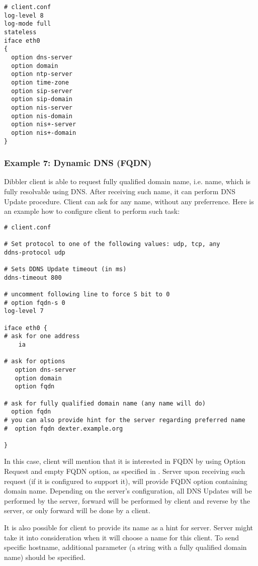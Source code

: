 \begin{lstlisting}
# client.conf
log-level 8
log-mode full
stateless
iface eth0
{
  option dns-server
  option domain
  option ntp-server
  option time-zone
  option sip-server
  option sip-domain
  option nis-server
  option nis-domain
  option nis+-server
  option nis+-domain
}
\end{lstlisting}

\subsubsection{Example 7: Dynamic DNS (FQDN)}
\label{example-client-fqdn}
Dibbler client is able to request fully qualified domain name,
i.e. name, which is fully resolvable using DNS. After receiving such
name, it can perform DNS Update procedure. Client can ask for any
name, without any preferrence. Here is an example how to configure
client to perform such task:
\begin{lstlisting}
# client.conf

# Set protocol to one of the following values: udp, tcp, any
ddns-protocol udp

# Sets DDNS Update timeout (in ms)
ddns-timeout 800

# uncomment following line to force S bit to 0
# option fqdn-s 0
log-level 7

iface eth0 {
# ask for one address
    ia

# ask for options
   option dns-server
   option domain
   option fqdn

# ask for fully qualified domain name (any name will do)
  option fqdn
# you can also provide hint for the server regarding preferred name
#  option fqdn dexter.example.org

}
\end{lstlisting}

In this case, client will mention that it is interested in FQDN by
using Option Request and empty FQDN option, as specified in
\cite{rfc4704}. Server upon receiving such request (if it is
configured to support it), will provide FQDN option containing domain
name. Depending on the server's configuration, all DNS Updates will be
performed by the server, forward will be performed by client and reverse
by the server, or only forward will be done by a client.

It is also possible for client to provide its name as a hint for
server. Server might take it into consideration when it will choose a
name for this client. To send specific hostname, additional parameter
(a string with a fully qualified domain name) should be specified.

